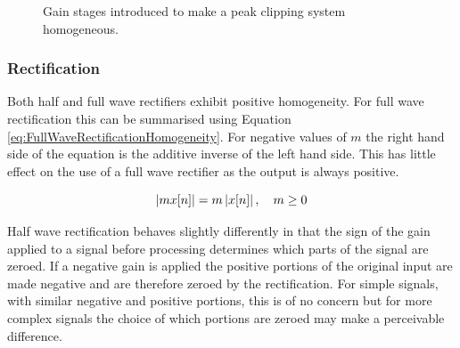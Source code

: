 			\begin{figure}[h!]
				\centering
				\caption{Gain stages introduced to make a peak clipping system homogeneous.}
				\label{fig:HomogeneousClipping}
			\end{figure}

		\subsubsection*{Rectification}
			Both half and full wave rectifiers exhibit positive homogeneity. For full wave rectification this
			can be summarised using Equation \ref{eq:FullWaveRectificationHomogeneity}. For negative values of
			$m$ the right hand side of the equation is the additive inverse of the left hand side. This has
			little effect on the use of a full wave rectifier as the output is always positive.

			\begin{equation}
				\left|mx[n]\right| = m\left|x[n]\right|, \quad m \geq 0
				\label{eq:FullWaveRectificationHomogeneity}
			\end{equation}

			Half wave rectification behaves slightly differently in that the sign of the gain applied to a
			signal before processing determines which parts of the signal are zeroed. If a negative gain is
			applied the positive portions of the original input are made negative and are therefore zeroed by
			the rectification. For simple signals, with similar negative and positive portions, this is of no
			concern but for more complex signals the choice of which portions are zeroed may make a perceivable
			difference.

